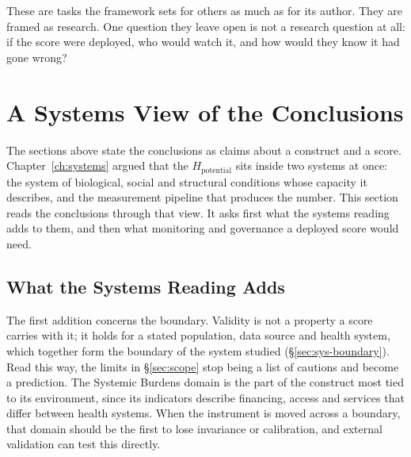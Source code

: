 These are tasks the framework sets for others as much as for its author. They
are framed as research. One question they leave open is not a research question
at all: if the score were deployed, who would watch it, and how would they know
it had gone wrong?

\section{A Systems View of the Conclusions}
\label{sec:conc-systems}

\noindent The sections above state the conclusions as claims about a construct
and a score. Chapter~\ref{ch:systems} argued that the $H_{\text{potential}}$
sits inside two systems at once: the system of biological, social and structural
conditions whose capacity it describes, and the measurement pipeline that
produces the number. This section reads the conclusions through that view. It
asks first what the systems reading adds to them, and then what monitoring and
governance a deployed score would need.

\subsection{What the Systems Reading Adds}

The first addition concerns the boundary. Validity is not a property a score
carries with it; it holds for a stated population, data source and health
system, which together form the boundary of the system studied
(\S\ref{sec:sys-boundary}). Read this way, the limits in \S\ref{sec:scope} stop
being a list of cautions and become a prediction. The Systemic Burdens domain is
the part of the construct most tied to its environment, since its indicators
describe financing, access and services that differ between health systems. When
the instrument is moved across a boundary, that domain should be the first to
lose invariance or calibration, and external validation can test this directly.

